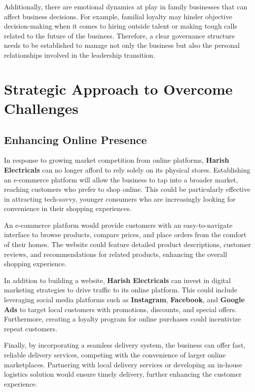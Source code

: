 \documentclass[a4paper,12pt]{report}
\begin{document}
Additionally, there are emotional dynamics at play in family businesses that can affect business decisions. For example, familial loyalty may hinder objective decision-making when it comes to hiring outside talent or making tough calls related to the future of the business. Therefore, a clear governance structure needs to be established to manage not only the business but also the personal relationships involved in the leadership transition.

\chapter{Strategic Approach to Overcome Challenges}

\section{Enhancing Online Presence}
In response to growing market competition from online platforms, \textbf{Harish Electricals} can no longer afford to rely solely on its physical stores. Establishing an e-commerce platform will allow the business to tap into a broader market, reaching customers who prefer to shop online. This could be particularly effective in attracting tech-savvy, younger consumers who are increasingly looking for convenience in their shopping experiences.

An e-commerce platform would provide customers with an easy-to-navigate interface to browse products, compare prices, and place orders from the comfort of their homes. The website could feature detailed product descriptions, customer reviews, and recommendations for related products, enhancing the overall shopping experience.

In addition to building a website, \textbf{Harish Electricals} can invest in digital marketing strategies to drive traffic to its online platform. This could include leveraging social media platforms such as \textbf{Instagram}, \textbf{Facebook}, and \textbf{Google Ads} to target local customers with promotions, discounts, and special offers. Furthermore, creating a loyalty program for online purchases could incentivize repeat customers.

Finally, by incorporating a seamless delivery system, the business can offer fast, reliable delivery services, competing with the convenience of larger online marketplaces. Partnering with local delivery services or developing an in-house logistics solution would ensure timely delivery, further enhancing the customer experience.
\end{document}
